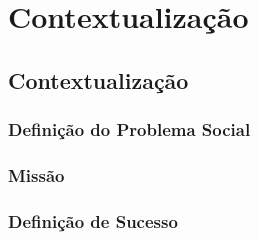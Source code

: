 \part{Contextualização}

\chapter[Contextualização]{Contextualização}

\section{Definição do Problema Social}

\section{Missão}

\section{Definição de Sucesso}

